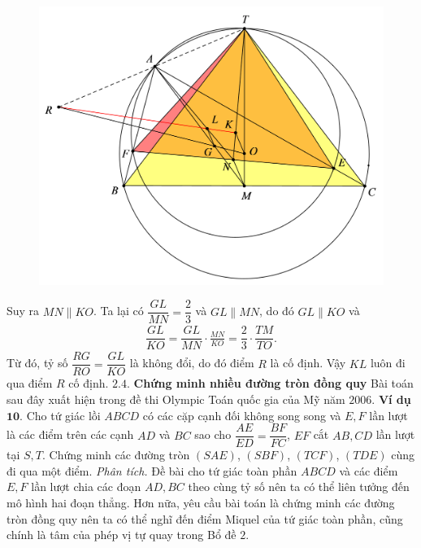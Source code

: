 \begin{multicols}{2}
	\begin{figure}[H]
		\vspace*{-5pt}
		\centering
		\captionsetup{labelformat= empty, justification=centering}
		\includegraphics[width= 1\linewidth]{17}
		\vspace*{-10pt}
	\end{figure}
	Suy ra $MN\parallel KO$. Ta lại có $\dfrac{GL}{MN} = \dfrac{2}{3}$  và $GL\parallel MN$, do đó $GL\parallel KO$ và
	\begin{align*}
		\dfrac{GL}{KO} = \dfrac{GL}{MN}\cdot \frac{MN}{KO} = \dfrac{2}{3} \cdot \dfrac{TM}{TO}.
	\end{align*}
	Từ đó, tỷ số $\dfrac{RG}{RO} = \dfrac{GL}{KO}$ là không đổi, do đó điểm $R$ là cố định. Vậy $KL$ luôn đi qua điểm $R$ cố định.
	\vskip 0.1cm
	$\pmb{2.4.}$ \textbf{\color{diendantoanhoc}Chứng minh nhiều đường tròn đồng quy}
	\vskip 0.1cm
	Bài toán sau đây xuất hiện trong đề thi Olympic Toán quốc gia của Mỹ năm $2006$.
	\vskip 0.1cm
	\textbf{\color{diendantoanhoc}Ví dụ $\pmb{10.}$}  Cho tứ giác lồi $ABCD$ có các cặp cạnh đối không song song và $E,F$ lần lượt là các điểm trên các cạnh $AD$ và $BC$ sao cho  $\dfrac{AE}{ED} = \dfrac{BF}{FC}$, $EF$ cắt $AB,CD$ lần lượt tại $S,T$. Chứng minh các đường tròn $(SAE)$, $(SBF)$, $(TCF)$, $(TDE)$ cùng đi qua một điểm.
	\vskip 0.1cm
	\textit{Phân tích.} Đề bài cho tứ giác toàn phần $ABCD$ và các điểm $E,F$ lần lượt chia các đoạn $AD,BC$ theo cùng tỷ số nên ta có thể liên tưởng đến mô hình hai đoạn thẳng. Hơn nữa, yêu cầu bài toán là chứng minh các đường tròn đồng quy nên ta có thể nghĩ đến điểm Miquel của tứ giác toàn phần, cũng chính là tâm của phép vị tự quay trong Bổ đề $2$.

\end{multicols}
